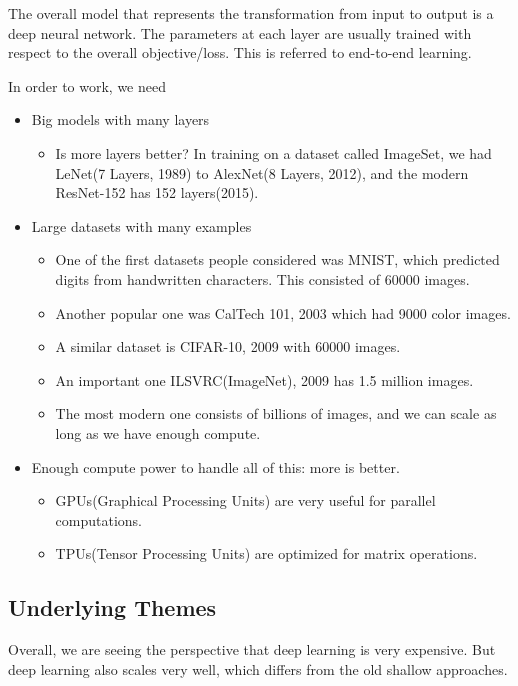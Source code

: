 \documentclass[11pt]{scrartcl}
\newcommand{\1}{\textbf{1}} %
\begin{document}
The overall model that represents the transformation from input to output is a deep neural network.  The parameters at each layer are usually trained with respect to the overall objective/loss.  This is referred to end-to-end learning. 

In order to work, we need
\begin{itemize}
\item Big models with many layers
\begin{itemize}
\item Is more layers better? In training on a dataset called ImageSet, we had LeNet(7 Layers, 1989) to AlexNet(8 Layers, 2012), and the modern ResNet-152 has 152 layers(2015).
\end{itemize}
\item Large datasets with many examples
\begin{itemize}
\item One of the first datasets people considered was MNIST, which predicted digits from handwritten characters.  This consisted of $60000$ images.
\item Another popular one was CalTech 101, 2003 which had 9000 color images.
\item A similar dataset is CIFAR-10, 2009 with 60000 images.
\item An important one ILSVRC(ImageNet), 2009 has 1.5 million images.
\item The most modern one consists of billions of images, and we can scale as long as we have enough compute.
\end{itemize}
\item Enough compute power to handle all of this: more is better.
\begin{itemize}
\item GPUs(Graphical Processing Units) are very useful for parallel computations.
\item TPUs(Tensor Processing Units) are optimized for matrix operations.
\end{itemize} 
\end{itemize}

\subsection{Underlying Themes}
Overall, we are seeing the perspective that deep learning is very expensive.  But deep learning also scales very well, which differs from the old shallow approaches.
\end{document}
